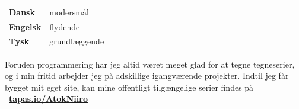 \documentclass[9pt]{template/developercv}
\begin{document}
\begin{minipage}[t]{0.25\textwidth}
  \vspace{-\baselineskip}


  \begin{tabular}{ll}
    \textbf{Dansk}   & modersmål \\
    \textbf{Engelsk} & flydende  \\
    \textbf{Tysk}    & grundlæggende
  \end{tabular}
\end{minipage}
\hfill
\begin{minipage}[t]{0.7\textwidth}
  \vspace{-\baselineskip}


  Foruden programmering har jeg altid været meget glad for at tegne tegneserier, og i min fritid arbejder jeg på adskillige igangværende projekter.
  Indtil jeg får bygget mit eget site, kan mine offentligt tilgængelige serier findes på \faLink~\href{https://tapas.io/AtokNiiro/series}{\textbf{tapas.io/AtokNiiro}}
\end{minipage}
\end{document}

